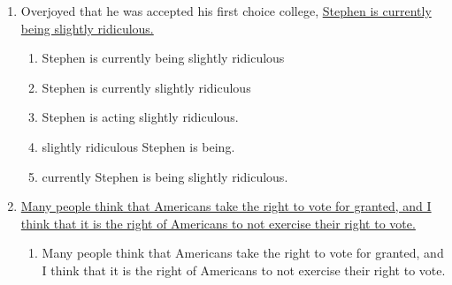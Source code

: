 \begin{enumerate}
\begin{enumerate}
\begin{spacing}{1.5}
\begin{enumerate}[label=(\Alph*)]
\item donned a red dress and arrived in the theater.

\hrulefill

\item arrived in the theater and donned a red dress.

\hrulefill

\item arrived in the theater wearing a red dress.

\hrulefill

\item arrived at the theater donning a red dress.

\hrulefill
\end{enumerate}
\end{spacing}

\bigskip
\item Overjoyed that he was accepted his first choice college, \ul{Stephen is currently being slightly ridiculous.}

\begin{spacing}{1.5}
\begin{enumerate}[label=(\Alph*)]
\item Stephen is currently being slightly ridiculous

\hrulefill

\item Stephen is currently slightly ridiculous

\hrulefill

\item Stephen is acting slightly ridiculous.

\hrulefill

\item slightly ridiculous Stephen is being.

\hrulefill

\item currently Stephen is being slightly ridiculous.

\hrulefill
\end{enumerate}
\end{spacing}

\bigskip
\item \ul{Many people think that Americans take the right to vote for granted, and I think that it is the right of Americans to not exercise their right to vote.}

\begin{spacing}{1.5}
\begin{enumerate}[label=(\Alph*)]
\item Many people think that Americans take the right to vote for granted, and I think that it is the right of Americans to not exercise their right to vote.


\end{enumerate}
\end{spacing}
\end{enumerate}
\end{enumerate}
